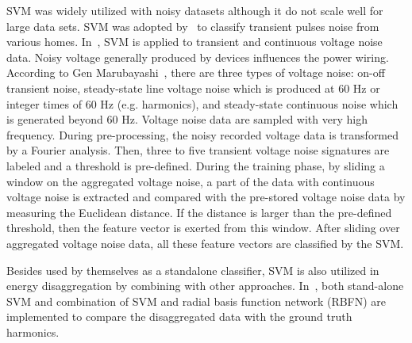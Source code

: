 SVM was widely utilized with  noisy datasets although it do not scale well for large data sets. 
 SVM was adopted by~\cite{patel2007flick}
to classify transient pulses noise from various homes.
In~\cite{froehlich2011disaggregated}, 
SVM is applied to transient and continuous voltage noise data.
Noisy voltage generally produced by devices influences
the power wiring.
According to Gen Marubayashi~\cite{mambayashi1997noise},
there are three types of voltage noise: 
on-off transient noise,
steady-state line voltage noise which is produced at $60$ Hz or
integer times of $60$ Hz (e.g. harmonics),
and steady-state continuous noise which is generated beyond
$60$ Hz.
Voltage noise data are sampled with very high frequency.
During pre-processing, the noisy recorded voltage data
is transformed by a Fourier analysis. 
Then, three to five transient voltage noise signatures are labeled
and a threshold is pre-defined.
During the training phase,
by sliding a window on the aggregated voltage noise,
a part of the data with continuous voltage noise
is extracted and compared with the pre-stored voltage noise data by measuring the
Euclidean distance.
If the distance is larger than the pre-defined
threshold, then the feature vector is exerted from
this window.
After sliding over aggregated voltage noise data,
all these feature vectors are classified
by the SVM.

Besides used by themselves as a standalone classifier, SVM is also utilized in energy disaggregation 
by combining with other approaches. 
In~\cite{nakano2007non}, 
both stand-alone SVM and combination of SVM and radial basis function network (RBFN)
are implemented to compare the disaggregated data with the ground truth harmonics.

